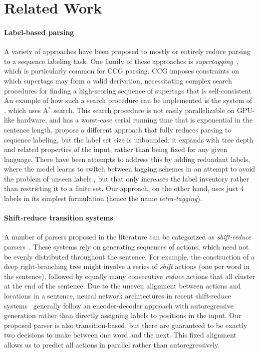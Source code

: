 \documentclass[11pt,a4paper]{article}
\begin{document}
\section{Related Work}

\paragraph{Label-based parsing} A variety of approaches have been proposed to mostly or entirely reduce parsing to a sequence labeling task. One family of these approaches is \emph{supertagging}~\citep{bangalore-joshi-1999-supertagging}, which is particularly common for CCG parsing. CCG imposes constraints on which supertags may form a valid derivation, necessitating complex search procedures for finding a high-scoring sequence of supertags that is self-consistent. An example of how such a search procedure can be implemented is the system of \citet{lee-etal-2016-global}, which uses A$^*$ search.
This search procedure is not easily parallelizable on GPU-like hardware, and has a worst-case serial running time that is exponential in the sentence length. \citet{gomez-rodriguez-vilares-2018-constituent} propose a different approach that fully reduces parsing to sequence labeling, but the label set size is unbounded: it expands with tree depth and related properties of the input, rather than being fixed for any given language. There have been attempts to address this by adding redundant labels, where the model learns to switch between tagging schemes in an attempt to avoid the problem of unseen labels \citep{vilares-etal-2019-better}, but that only increases the label inventory rather than restricting it to a finite set. Our approach, on the other hand, uses just 4 labels in its simplest formulation (hence the name \emph{tetra-tagging}).

\paragraph{Shift-reduce transition systems} A number of parsers proposed in the literature can be categorized as \emph{shift-reduce} parsers~\citep{henderson-2003-inducing,sagae-lavie-2005-classifier,zhang-clark-2009-transition,zhu-etal-2013-fast}. These systems rely on generating sequences of actions, which need not be evenly distributed throughout the sentence. For example, the construction of a deep right-branching tree might involve a series of \emph{shift} actions (one per word in the sentence), followed by equally many consecutive \emph{reduce} actions that all cluster at the end of the sentence. Due to the uneven alignment between actions and locations in a sentence, neural network architectures in recent shift-reduce systems~\citep{vinyals-etal-2015-grammar,dyer-etal-2016-recurrent,liu-zhang-2017-order} generally follow an encoder-decoder approach with autoregressive generation rather than directly assigning labels to positions in the input. Our proposed parser is also transition-based, but there are guaranteed to be exactly two decisions to make between one word and the next. This fixed alignment allows us to predict all actions in parallel rather than autoregressively.
\end{document}
